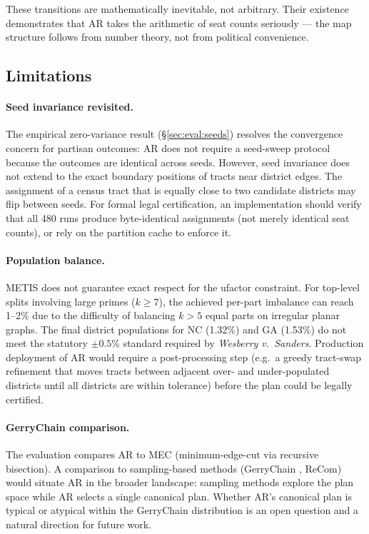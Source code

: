 These transitions are mathematically inevitable, not arbitrary. Their
existence demonstrates that AR takes the arithmetic of seat counts seriously
--- the map structure follows from number theory, not from political convenience.

\subsection{Limitations}
\label{sec:discussion:limitations}

\paragraph{Seed invariance revisited.}
The empirical zero-variance result (\S\ref{sec:eval:seeds}) resolves the
convergence concern for partisan outcomes: AR does not require a seed-sweep
protocol because the outcomes are identical across seeds. However, seed
invariance does not extend to the exact boundary positions of tracts near
district edges. The assignment of a census tract that is equally close to two
candidate districts may flip between seeds. For formal legal certification, an
implementation should verify that all 480 runs produce byte-identical
assignments (not merely identical seat counts), or rely on the partition cache
to enforce it.

\paragraph{Population balance.}
METIS does not guarantee exact respect for the ufactor constraint. For
top-level splits involving large primes ($k \geq 7$), the achieved per-part
imbalance can reach 1--2\% due to the difficulty of balancing $k > 5$ equal
parts on irregular planar graphs. The final district populations for NC
(1.32\%) and GA (1.53\%) do not meet the statutory $\pm 0.5\%$ standard
required by \emph{Wesberry v.\ Sanders}. Production deployment of AR would
require a post-processing step (e.g.\ a greedy tract-swap refinement that
moves tracts between adjacent over- and under-populated districts until all
districts are within tolerance) before the plan could be legally certified.

\paragraph{GerryChain comparison.}
The evaluation compares AR to MEC (minimum-edge-cut via recursive bisection).
A comparison to sampling-based methods (GerryChain \citep{duchin2019gerrychain},
ReCom) would situate AR in the broader landscape: sampling methods explore the
plan space while AR selects a single canonical plan. Whether AR's canonical
plan is typical or atypical within the GerryChain distribution is an open
question and a natural direction for future work.

